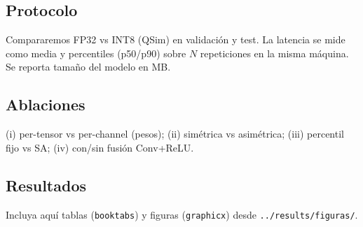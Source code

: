 \subsection*{Protocolo}
Compararemos FP32 vs INT8 (QSim) en validación y test. La latencia se mide como media y percentiles
(p50/p90) sobre $N$ repeticiones en la misma máquina. Se reporta tamaño del modelo en MB.

\subsection*{Ablaciones}
(i) per-tensor vs per-channel (pesos); (ii) simétrica vs asimétrica; (iii) percentil fijo vs SA;
(iv) con/sin fusión Conv+ReLU.

\subsection*{Resultados}
Incluya aquí tablas (\texttt{booktabs}) y figuras (\texttt{graphicx}) desde \texttt{../results/figuras/}.
